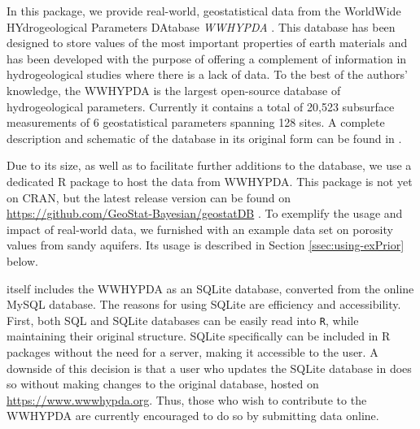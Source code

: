 In this package, we provide real-world, geostatistical data from the WorldWide HYdrogeological Parameters DAtabase \textit{WWHYPDA} \citep{Comunian2009}.
This database has been designed to store values of the most important properties of earth materials and has been developed with the purpose of offering a complement of information in hydrogeological studies where there is a lack of data. 
To the best of the authors' knowledge, the WWHYPDA is the largest open-source database of hydrogeological parameters. 
Currently it contains a total of 20,523 subsurface measurements of 6 geostatistical parameters spanning 128 sites. 
A complete description and schematic of the database in its original form can be found in \citet{Comunian2009}.

Due to its size, as well as to facilitate further additions to the database, we use a dedicated R package  to host the data from WWHYPDA.
This package is not yet on CRAN, but the latest release version can be found on \url{https://github.com/GeoStat-Bayesian/geostatDB} \citep{geostatDB_zenodo}.
To exemplify the usage and impact of real-world data, we furnished  with an example data set on porosity values from sandy aquifers. 
Its usage is described in Section \ref{ssec:using-exPrior} below.

 itself includes the WWHYPDA as an SQLite database, converted from the online MySQL database. 
The reasons for using SQLite are efficiency and accessibility. 
First, both SQL and SQLite databases can be easily read into \texttt{R}, while maintaining their original structure. 
SQLite specifically can be included in R packages without the need for a server, making it accessible to the user. 
A downside of this decision is that a user who updates the SQLite database in  does so without making changes to the original database, hosted on \url{https://www.wwwhypda.org}.
Thus, those who wish to contribute to the WWHYPDA are currently encouraged to do so by submitting data online.

